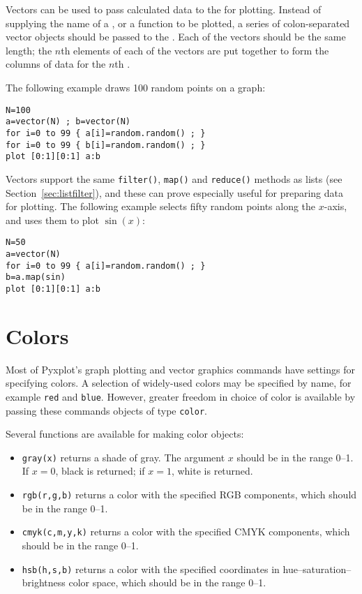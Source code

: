 Vectors can be used to pass calculated data to the  for plotting.
Instead of supplying the name of a \datafile, or a function to be plotted, a
series of colon-separated vector objects should be passed to the
. Each of the vectors should be the same length; the $n$th
elements of each of the vectors are put together to form the columns of data
for the $n$th \datapoint.

The following example draws 100 random points on a graph:

\begin{verbatim}
N=100
a=vector(N) ; b=vector(N)
for i=0 to 99 { a[i]=random.random() ; }
for i=0 to 99 { b[i]=random.random() ; }
plot [0:1][0:1] a:b
\end{verbatim}

Vectors support the same {\tt filter()}, {\tt map()} and {\tt reduce()} methods
as lists (see Section~\ref{sec:listfilter}), and these can prove especially
useful for preparing data for plotting. The following example selects fifty
random points along the $x$-axis, and uses them to plot $\sin(x)$:

\begin{verbatim}
N=50
a=vector(N)
for i=0 to 99 { a[i]=random.random() ; }
b=a.map(sin)
plot [0:1][0:1] a:b
\end{verbatim}

\section{Colors}

Most of Pyxplot's graph plotting and vector graphics commands have settings for
specifying colors. A selection of widely-used colors may be specified by name,
for example {\tt red} and {\tt blue}. However, greater freedom in choice of
color is available by passing these commands objects of type {\tt color}.

Several functions are available for making color objects:

\begin{itemize}
\item {\tt gray(x)} returns a shade of gray. The argument $x$ should be in the range 0--1. If $x=0$, black is returned; if $x=1$, white is returned.
\item {\tt rgb(r,g,b)} returns a color with the specified RGB components, which should be in the range 0--1.
\item {\tt cmyk(c,m,y,k)} returns a color with the specified CMYK components, which should be in the range 0--1.
\item {\tt hsb(h,s,b)} returns a color with the specified coordinates in hue--saturation--brightness color space, which should be in the range 0--1.
\end{itemize}

